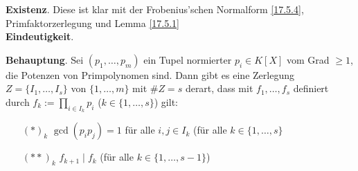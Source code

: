 \documentclass[../../main.tex]{subfiles}
\begin{document}
\begin{cproof}
\textbf{Existenz}. Diese ist klar mit der Frobenius'schen Normalform \ref{17.5.4}, Primfaktorzerlegung und Lemma \ref{17.5.1}\\

\noindent\textbf{Eindeutigkeit}.
\begin{tcolorbox}[arc=0mm, boxrule=0.2mm]\noindent\textbf{Behauptung}. Sei $(p_1,\ldots ,p_m)$ ein Tupel normierter $p_i\in K[X]$ vom Grad $\ge 1$, die Potenzen von Primpolynomen sind. Dann gibt es eine Zerlegung $Z=\{I_1,\ldots ,I_s\}$ von $\{1,\ldots ,m\}$ mit $\#Z=s$ derart, dass mit $f_1,\ldots ,f_s$ definiert durch $f_k:=\prod_{i\in I_k}p_i$ ($k\in\{1,\ldots ,s\}$) gilt:
\begin{itemize}
\item[$(*)_k$] $\gcd(p_ip_j)=1$ für alle $i,j\in I_k$ (für alle $k\in\{1,\ldots ,s\}$
\item[$(**)_k$] $f_{k+1}\mid f_k$ (für alle $k\in\{1,\ldots ,s-1\}$)
\end{itemize}


\end{tcolorbox}
\end{cproof}
\end{document}
